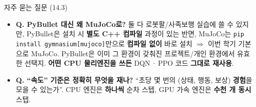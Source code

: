 \begin{frame}{자주 묻는 질문 (14.3)}
  \small
  \begin{itemize}
    \item \textbf{Q. PyBullet 대신 왜 MuJoCo로?}
      둘 다 로봇팔/사족보행 실습에 쓸 수 있지만, PyBullet은
      설치 시 \textbf{별도 C++ 컴파일} 과정이 있는 반면,
      MuJoCo는 \texttt{pip install gymnasium[mujoco]}만으로
      \textbf{컴파일 없이} 바로 설치 $\Rightarrow$ 이번 학기
      기본으로 MuJoCo. PyBullet은 이미 그 환경이 갖춰진
      프로젝트/개인 환경에서 유효한 선택지. \textbf{어떤 CPU
      물리엔진을 쓰든} DQN\,·\,PPO 코드 \textbf{그대로 재사용}.
    \item \textbf{Q. ``속도'' 기준은 정확히 무엇을 재나?}
      ``초당 몇 번의 (상태, 행동, 보상) \textbf{경험}을 모을 수
      있는가''. CPU 엔진은 \textbf{하나씩} 순차 스텝, GPU 가속
      엔진은 \textbf{수천 개 동시} 스텝.
  \end{itemize}
\end{frame}
